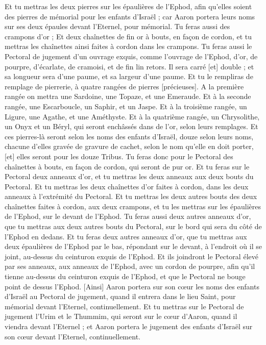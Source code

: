 \begin{multicols}{2}
Et tu mettras les deux pierres sur les épaulières de l'Ephod, afin qu'elles soient des pierres de mémorial pour les enfants d'Israël ; car Aaron portera leurs noms sur ses deux épaules devant l'Eternel, pour mémorial.
Tu feras aussi des crampons d'or ;
Et deux chaînettes de fin or à bouts, en façon de cordon, et tu mettras les chaînettes ainsi faites à cordon dans les crampons.
Tu feras aussi le Pectoral de jugement d'un ouvrage exquis, comme l'ouvrage de l'Ephod, d'or, de pourpre, d'écarlate, de cramoisi, et de fin lin retors.
Il sera carré [et] double ; et sa longueur sera d'une paume, et sa largeur d'une paume.
Et tu le rempliras de remplage de pierrerie, à quatre rangées de pierres [précieuses]. A la première rangée on mettra une Sardoine, une Topaze, et une Emeraude.
Et à la seconde rangée, une Escarboucle, un Saphir, et un Jaspe.
Et à la troisième rangée, un Ligure, une Agathe, et une Améthyste.
Et à la quatrième rangée, un Chrysolithe, un Onyx et un Béryl, qui seront enchâssés dans de l'or, selon leurs remplages.
Et ces pierres-là seront selon les noms des enfants d'Israël, douze selon leurs noms, chacune d'elles gravée de gravure de cachet, selon le nom qu'elle en doit porter, [et] elles seront pour les douze Tribus.
Tu feras donc pour le Pectoral des chaînettes à bouts, en façon de cordon, qui seront de pur or.
Et tu feras sur le Pectoral deux anneaux d'or, et tu mettras les deux anneaux aux deux bouts du Pectoral.
Et tu mettras les deux chaînettes d'or faites à cordon, dans les deux anneaux à l'extrémité du Pectoral.
Et tu mettras les deux autres bouts des deux chaînettes faites à cordon, aux deux crampons, et tu les mettras sur les épaulières de l'Ephod, sur le devant de l'Ephod.
Tu feras aussi deux autres anneaux d'or, que tu mettras aux deux autres bouts du Pectoral, sur le bord qui sera du côté de l'Ephod en dedans.
Et tu feras deux autres anneaux d'or, que tu mettras aux deux épaulières de l'Ephod par le bas, répondant sur le devant, à l'endroit où il se joint, au-dessus du ceinturon exquis de l'Ephod.
Et ils joindront le Pectoral élevé par ses anneaux, aux anneaux de l'Ephod, avec un cordon de pourpre, afin qu'il tienne au-dessus du ceinturon exquis de l'Ephod, et que le Pectoral ne bouge point de dessus l'Ephod.
[Ainsi] Aaron portera sur son cœur les noms des enfants d'Israël au Pectoral de jugement, quand il entrera dans le lieu Saint, pour mémorial devant l'Eternel, continuellement.
Et tu mettras sur le Pectoral de jugement l'Urim et le Thummim, qui seront sur le cœur d'Aaron, quand il viendra devant l'Eternel ; et Aaron portera le jugement des enfants d'Israël sur son cœur devant l'Eternel, continuellement.

\end{multicols}
